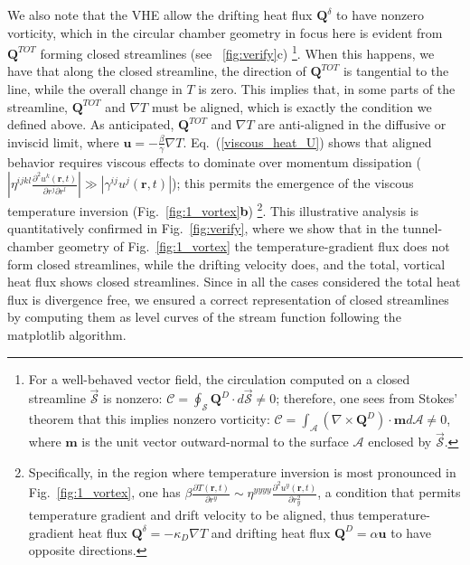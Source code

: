 \documentclass[
prb,
twocolumn,
superscriptaddress,
 amsmath,amssymb,
 aps,
longbibliography,
]{revtex4-2}
\begin{document}
We also note that the VHE allow the drifting heat flux $\bm{Q}^{\delta}$ to have nonzero vorticity, which in the circular chamber geometry in focus here is evident from $\bm{Q}^{TOT}$ forming closed streamlines (see ~\ref{fig:verify}c) \footnote{For a well-behaved vector field, the circulation computed on a closed streamline $\vec{\mathcal{S}}$ is nonzero: $\mathcal{C}=\oint_{\mathcal{S}}\bm{Q}^D{\cdot} d\vec{\mathcal{S}}\neq 0$; therefore, one sees from Stokes' theorem that this implies nonzero vorticity: $\mathcal{C}=\int_{\mathcal{A}}(\nabla {\times} \bm{Q}^D){\cdot}\bm{m} d{\mathcal{A}}\neq 0$, where $\bm{m}$ is the unit vector outward-normal to the surface $\mathcal{A}$ enclosed by $\vec{\mathcal{S}}$.}.
When this happens, we have that along the closed streamline, the direction of $\bm{Q}^{TOT}$ is tangential to the line, while the overall change in $T$ is zero. This implies that, in some parts of the streamline, $\bm{Q}^{TOT}$ and $\nabla T$ must be aligned, which is exactly the condition we defined above.
As anticipated, $\bm{Q}^{TOT}$ and $\nabla T$ are anti-aligned in the diffusive or inviscid limit, where $\bm{u}{=}{-}\tfrac{\beta}{\gamma}\nabla T$. Eq.~(\ref{viscous_heat_U}) shows that aligned behavior requires viscous effects to dominate over momentum dissipation ($|\eta^{ijkl} \frac{\partial^2 u^k({\bm r}, t)}{\partial r^j \partial r^l} |\gg |\gamma^{ij} u^j({\bm r}, t)|$); this permits the emergence of the viscous temperature inversion  (Fig.~\ref{fig:1_vortex}\textbf{b}) \footnote{Specifically, in the region where temperature inversion is most pronounced in Fig.~\ref{fig:1_vortex}, one has $\beta\frac{\partial T({\bm r}, t)}{\partial r^y} {\sim} \eta^{yyyy} \frac{\partial^2 u^y({\bm r}, t)}{\partial r_y^2}$, a condition that permits temperature gradient and drift velocity to be aligned, thus temperature-gradient heat flux $\bm{Q}^\delta=-\kappa_D\nabla T$ and drifting heat flux $\bm{Q}^D=\alpha\bm{u}$ to have opposite directions.}.
This illustrative analysis is quantitatively confirmed in Fig.~\ref{fig:verify}, where we show that in the tunnel-chamber geometry of Fig.~\ref{fig:1_vortex} the temperature-gradient flux does not form closed streamlines, while the drifting velocity does, and the total, vortical heat flux shows closed streamlines.
Since in all the cases considered the total heat flux is divergence free, we ensured a correct representation of closed streamlines by computing them as level curves of the stream function following the matplotlib algorithm\cite{Hunter_2007,streamlines_curve_level_streamfunction}.
\end{document}
